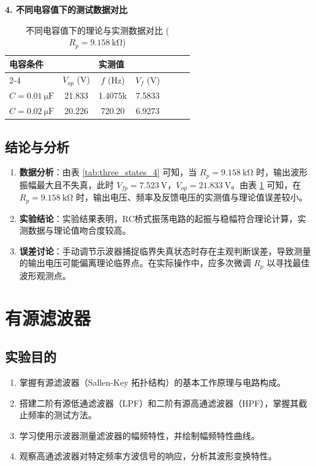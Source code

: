 \documentclass[UTF8, a4paper]{ctexrep} %
\begin{document}
\textbf{4. 不同电容值下的测试数据对比}

\begin{table}[H]
    \centering
    \caption{不同电容值下的理论与实测数据对比 ($R_p = \qty{9.158}{\kilo\ohm}$)}
    \label{tab:cap_data_4}
    \begin{tabular}{lcccccc}
        \toprule
        \multirow{2}{*}{电容条件} & \multicolumn{3}{c}{实测值} \\
        \cmidrule(lr){2-4}
        & $V_{op}$ (\unit{\volt}) & $f$ (\unit{\Hz}) & $V_f$ (\unit{\volt}) \\
        \midrule
        $C=\qty{0.01}{\micro\farad}$ & 21.833 & 1.4075k & 7.5833 \\
        $C=\qty{0.02}{\micro\farad}$ & 20.226 & 720.20 & 6.9273 \\
        \bottomrule
    \end{tabular}
\end{table}

\section{结论与分析} \label{subsec:conclusion_4}

\begin{enumerate}
    \item \textbf{数据分析}：由表 \ref{tab:three_states_4} 可知，当 $R_p = \qty{9.158}{\kilo\ohm}$ 时，输出波形振幅最大且不失真，此时 $V_{fp} = \qty{7.523}{\volt}$，$V_{op} = \qty{21.833}{\volt}$。由表 \ref{tab:cap_data_4} 可知，在 $R_p = \qty{9.158}{\kilo\ohm}$ 时，输出电压、频率及反馈电压的实测值与理论值误差较小。
    \item \textbf{实验结论}：实验结果表明，RC桥式振荡电路的起振与稳幅符合理论计算，实测数据与理论值吻合度较高。
    \item \textbf{误差讨论}：手动调节示波器捕捉临界失真状态时存在主观判断误差，导致测量的输出电压可能偏离理论临界点。在实际操作中，应多次微调 $R_p$ 以寻找最佳波形观测点。
\end{enumerate}

\chapter{有源滤波器}
\label{chap:active_filters}

\section{实验目的}
\begin{enumerate}
    \item 掌握有源滤波器（Sallen-Key 拓扑结构）的基本工作原理与电路构成。
    \item 搭建二阶有源低通滤波器（LPF）和二阶有源高通滤波器（HPF），掌握其截止频率的测试方法。
    \item 学习使用示波器测量滤波器的幅频特性，并绘制幅频特性曲线。
    \item 观察高通滤波器对特定频率方波信号的响应，分析其波形变换特性。
\end{enumerate}
\end{document}
